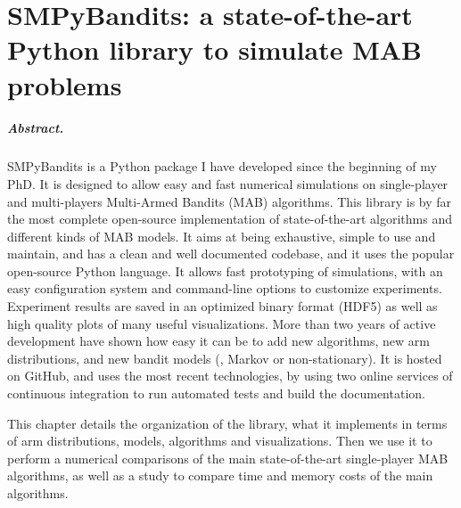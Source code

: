 
\chapter{SMPyBandits: a state-of-the-art Python library to simulate MAB problems}
\label{chapter:3}
\minitoc



\newpage
\paragraph{Abstract.}
%
SMPyBandits is a Python package I have developed since the beginning of my PhD.
It is designed to allow easy and fast numerical simulations on single-player and multi-players Multi-Armed Bandits (MAB) algorithms.
This library is by far the most complete open-source implementation of state-of-the-art algorithms and different kinds of MAB models.
It aims at being exhaustive, simple to use and maintain, and has a clean and well documented codebase, and it uses the popular open-source Python language.
It allows fast prototyping of simulations, with an easy configuration system and command-line options to customize experiments.
Experiment results are saved in an optimized binary format (HDF5) as well as high quality plots of many useful visualizations.
%
More than two years of active development have shown how easy it can be to add new algorithms, new arm distributions, and new bandit models (\eg, Markov or non-stationary).
It is hosted on GitHub, and uses the most recent technologies, by using two online services of continuous integration to run automated tests and build the documentation.

This chapter details the organization of the library, what it implements in terms of arm distributions, models, algorithms and visualizations.
Then we use it to perform a numerical comparisons of the main state-of-the-art single-player MAB algorithms, as well as a study to compare time and memory costs of the main algorithms.

\graphicspath{{2-Chapters/3-Chapter/Images/}}
\graphicspath{{2-Chapters/3-Chapter/SMPyBandits_paper.git/plots/}}

